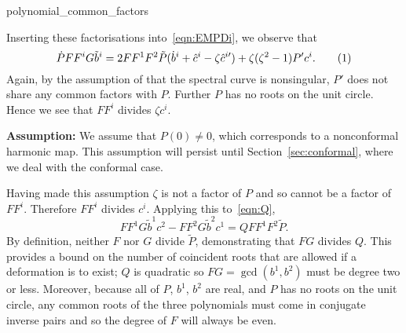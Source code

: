 \documentclass{article}
\begin{document}
{polynomial_common_factors}

Inserting these factorisations into~\eqref{eqn:EMPDi}, we observe that
\[
\dot{P} F F^i G \tilde{b}^i = 2 F F^1 F^2 \tilde{P} (\dot{b}^i + \hat{c}^i - \zeta\hat{c}^{i\prime}) + \zeta(\zeta^2-1 ) P'c^i.
\labelthis{eqn:EMPDi all factors}
\]
Again, by the assumption of that the spectral curve is nonsingular, $P'$ does not share any common factors with $P$. Further $P$ has no roots on the unit circle. Hence we see that $FF^i$ divides $\zeta c^i$. 

\textbf{Assumption:} We assume that $P(0)\neq 0$, which corresponds to a nonconformal harmonic map. This assumption will persist until Section~\ref{sec:conformal}, where we deal with the conformal case.

Having made this assumption $\zeta$ is not a factor of $P$ and so cannot be a factor of $FF^i$. Therefore $FF^i$ divides $c^i$. Applying this to~\eqref{eqn:Q},
\[
FF^1G\tilde{b}^1 c^2 - FF^2G\tilde{b}^2 c^1 = Q FF^1F^2\tilde{P}.
\]
By definition, neither $F$ nor $G$ divide $\tilde{P}$, demonstrating that $FG$ divides $Q$. This provides a bound on the number of coincident roots that are allowed if a deformation is to exist; $Q$ is quadratic so $FG = \gcd(b^1,b^2)$ must be degree two or less. Moreover, because all of $P$, $b^1$, $b^2$ are real, and $P$ has no roots on the unit circle, any common roots of the three polynomials must come in conjugate inverse pairs and so the degree of $F$ will always be even.
\end{document}
